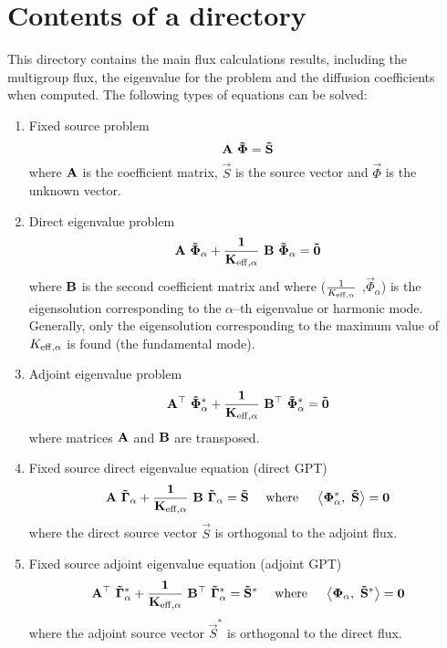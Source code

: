 \section{Contents of a 
 directory}\label{sect:fluxunkdir}

This directory contains the main flux calculations results, including the multigroup flux, the
eigenvalue for the problem and the diffusion coefficients when computed. The following types of
equations can be solved:
\begin{enumerate}
\item Fixed source problem
\begin{equation}
\bf{A} \ \vec\Phi = \vec S
\label{eq:flux1}
\end{equation}
\noindent where $\bf{A}$ is the coefficient matrix, $\vec S$ is the source vector and
$\vec\Phi$ is the unknown vector.

\item Direct eigenvalue problem
\begin{equation}
\bf{A} \ \vec\Phi_\alpha + {1 \over K_{{\rm eff},\alpha}} \ \bf{B} \ \vec\Phi_\alpha = \vec 0
\label{eq:flux2}
\end{equation}
\noindent where $\bf{B}$ is the second coefficient matrix and where (${1 \over K_{{\rm eff},\alpha}}$
,$\vec\Phi_\alpha$) is the eigensolution corresponding to the $\alpha$--th eigenvalue
or harmonic mode. Generally, only the eigensolution corresponding to the maximum value of $K_{{\rm eff},\alpha}$ is found (the fundamental mode).

\item Adjoint eigenvalue problem
\begin{equation}
\bf{A}^\top \ \vec\Phi_\alpha^* + {1 \over K_{{\rm eff},\alpha}} \ \bf{B}^\top \ \vec\Phi_\alpha^* = \vec 0
\label{eq:flux3}
\end{equation}
\noindent where matrices $\bf{A}$ and $\bf{B}$ are transposed.

\item Fixed source direct eigenvalue equation (direct GPT)
\begin{equation}
\bf{A} \ \vec\Gamma_\alpha + {1 \over K_{{\rm eff},\alpha}} \ \bf{B} \ \vec\Gamma_\alpha = \vec S
\ \ \ \ {\rm where} \ \ \ \ \left<\Phi_\alpha^*, \ \vec S \right>=0
\label{eq:flux4}
\end{equation}
\noindent where the direct source vector $\vec S$ is orthogonal to the adjoint flux.

\item Fixed source adjoint eigenvalue equation (adjoint GPT)
\begin{equation}
\bf{A}^\top \ \vec\Gamma_\alpha^* + {1 \over K_{{\rm eff},\alpha}} \ \bf{B}^\top \ \vec\Gamma_\alpha^* = \vec S^*
\ \ \ \ {\rm where} \ \ \ \ \left<\Phi_\alpha, \ \vec S^* \right>=0
\label{eq:flux5}
\end{equation}
\noindent where the adjoint source vector $\vec S^*$ is orthogonal to the direct flux.

\end{enumerate}

